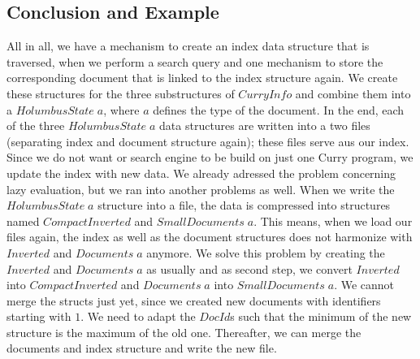 \documentclass[%
	latex,%
	a4paper,%
	oneside,%
	chapterprefix,%
	headsepline,%
	12pt%
]{scrbook}
\newcommand{\Conid}[1]{\mathit{#1}}
\newcommand{\Varid}[1]{\mathit{#1}}
\begin{document}



\subsection{Conclusion and Example}
All in all, we have a mechanism to create an index data structure that
is traversed, when we perform a search query and one mechanism to
store the corresponding document that is linked to the index
structure again. %
We create these structures for the three substructures of \ensuremath{\Conid{CurryInfo}}
and combine them into a \ensuremath{\Conid{HolumbusState}\;\Varid{a}}, where \ensuremath{\Varid{a}} defines the type
of the document. %
In the end, each of the three \ensuremath{\Conid{HolumbusState}\;\Varid{a}} data structures are
written into a two files (separating index and document structure
again); these files serve aus our index. \\

Since we do not want or search engine to be build on just one Curry
program, we update the index with new data. %
We already adressed the problem concerning lazy evaluation, but we ran
into another problems as well. %
When we write the \ensuremath{\Conid{HolumbusState}\;\Varid{a}} structure into a file, the data is
compressed into structures named \ensuremath{\Conid{CompactInverted}} and \ensuremath{\Conid{SmallDocuments}\;\Varid{a}}. %
This means, when we load our files again, the index as well as the
document structures does not harmonize with \ensuremath{\Conid{Inverted}} and \ensuremath{\Conid{Documents}\;\Varid{a}} anymore. %
We solve this problem by creating the \ensuremath{\Conid{Inverted}} and \ensuremath{\Conid{Documents}\;\Varid{a}} as
usually and as second step, we convert \ensuremath{\Conid{Inverted}} into
\ensuremath{\Conid{CompactInverted}} and \ensuremath{\Conid{Documents}\;\Varid{a}} into \ensuremath{\Conid{SmallDocuments}\;\Varid{a}}. %
We cannot merge the structs just yet, since we created new documents
with identifiers starting with \ensuremath{\mathrm{1}}. %
We need to adapt the \ensuremath{\Conid{DocId}}s such that the minimum of the new
structure is the maximum of the old one. %
Thereafter, we can merge the documents and index structure and write
the new file. \\
\end{document}
